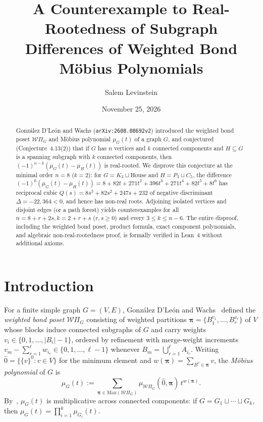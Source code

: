 \documentclass[11pt]{article}
\title{A Counterexample to Real-Rootedness of Subgraph Differences of Weighted Bond M\"obius Polynomials}
\author{Salem Levinstein}
\date{November 25, 2026}
\theoremstyle{remark}
\begin{document}
\maketitle

\begin{abstract}
Gonz\'alez D'Le\'on and Wachs (\texttt{arXiv:2608.08692v2}) introduced the weighted bond poset $\mathcal{W}\Pi_G$ and M\"obius polynomial $\mu_G(t)$ of a graph $G$, and conjectured (Conjecture~4.13(2)) that if $G$ has $n$ vertices and $k$ connected components and $H \subseteq G$ is a spanning subgraph with $k$ connected components, then $(-1)^{n-k}(\mu_G(t) - \mu_H(t))$ is real-rooted. We disprove this conjecture at the minimal order $n = 8$ ($k = 2$): for $G = K_3 \sqcup \mathrm{House}$ and $H = P_3 \sqcup C_5$, the difference $(-1)^6(\mu_G(t) - \mu_H(t)) = 8 + 82t + 271t^2 + 396t^3 + 271t^4 + 82t^5 + 8t^6$ has reciprocal cubic $Q(s) = 8s^3 + 82s^2 + 247s + 232$ of negative discriminant $\Delta = -22{,}364 < 0$, and hence has non-real roots. Adjoining isolated vertices and disjoint edges (or a path forest) yields counterexamples for all $n = 8 + r + 2s, k = 2 + r + s$ ($r, s \ge 0$) and every $3 \le k \le n - 6$. The entire disproof, including the weighted bond poset, product formula, exact component polynomials, and algebraic non-real-rootedness proof, is formally verified in Lean~4 without additional axioms.
\end{abstract}

\section{Introduction}

For a finite simple graph $G = (V, E)$, Gonz\'alez D'Le\'on and Wachs~\cite{GDW2026} defined the \emph{weighted bond poset} $\mathcal{W}\Pi_G$ consisting of weighted partitions $\boldsymbol{\pi} = \{B_1^{v_1}, \dots, B_r^{v_r}\}$ of $V$ whose blocks induce connected subgraphs of $G$ and carry weights $v_i \in \{0, 1, \dots, |B_i| - 1\}$, ordered by refinement with merge-weight increments $v_m - \sum_{r=1}^\ell w_{i_r} \in \{0, 1, \dots, \ell - 1\}$ whenever $B_m = \bigcup_{r=1}^\ell A_{i_r}$. Writing $\hat{0} = \{\{v\}^0 : v \in V\}$ for the minimum element and $w(\boldsymbol{\pi}) = \sum_{B^v \in \boldsymbol{\pi}} v$, the \emph{M\"obius polynomial} of $G$ is
\[
  \mu_G(t) := \sum_{\boldsymbol{\pi} \in \mathrm{Max}(\mathcal{W}\Pi_G)} \mu_{\mathcal{W}\Pi_G}(\hat{0}, \boldsymbol{\pi}) \, t^{w(\boldsymbol{\pi})}.
\]
By~\cite[Proposition~2.2]{GDW2026}, $\mu_G(t)$ is multiplicative across connected components: if $G = G_1 \sqcup \cdots \sqcup G_k$, then $\mu_G(t) = \prod_{i=1}^k \mu_{G_i}(t)$.
\end{document}
